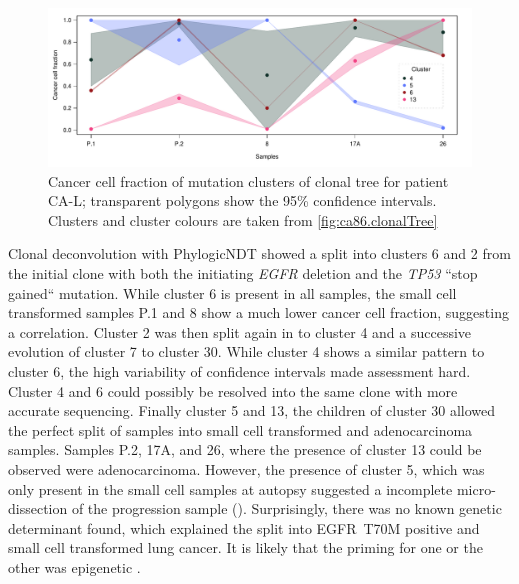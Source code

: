 \begin{figure}[ht]
\centering
\includegraphics[width=.99\linewidth]{Figures/CASCADE/CA86/CA86.ccf_cluster.pdf}
\caption[Cancer cell fraction of mutation clusters of clonal tree for patient CA-L]{Cancer cell fraction of mutation clusters of clonal tree for patient CA-L; transparent polygons show the 95\% confidence intervals. Clusters and cluster colours are taken from \protect\autoref{fig:ca86.clonalTree}} \label{fig:ca86.ccfCluster}
\end{figure}



Clonal deconvolution with PhylogicNDT showed a split into clusters 6 and 2 from the initial clone with both the initiating \textit{EGFR} deletion and the \textit{TP53} ``stop gained`` mutation. While cluster 6 is present in all samples, the small cell transformed samples P.1 and 8 show a much lower cancer cell fraction, suggesting a correlation. Cluster 2 was then split again in to cluster 4 and a successive evolution of cluster 7 to cluster 30. While cluster 4 shows a similar pattern to cluster 6, the high variability of confidence intervals made assessment hard. Cluster 4 and 6 could possibly be resolved into the same clone with more accurate sequencing. Finally cluster 5 and 13, the children of cluster 30 allowed the perfect split of samples into small cell transformed and adenocarcinoma samples. Samples P.2, 17A, and 26, where the presence of cluster 13 could be observed were adenocarcinoma. However, the presence of cluster 5, which was only present in the small cell samples at autopsy suggested a incomplete micro-dissection of the progression sample (). Surprisingly, there was no known genetic determinant found, which explained the split into EGFR~T70M positive and small cell transformed lung cancer. It is likely that the priming for one or the other was epigenetic \cite{Fennell2021,Suva2013}.



\cleardoublepage